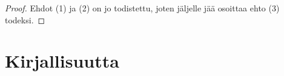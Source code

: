 \documentclass[12pt]{article}
\theoremstyle{definition}
\theoremstyle{plain}
\begin{document}
\begin{proof}
Ehdot (1) ja (2) on jo todistettu, joten jäljelle jää osoittaa ehto (3) todeksi. 
\end{proof}
\newline

\newpage
\section{Kirjallisuutta}
\onehalfspacing
[1] 
\newline
[2]
\newline
[3]
\newline
[4]
\end{document}
